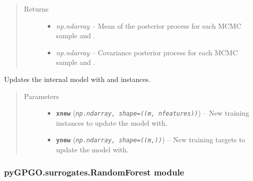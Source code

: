 \documentclass[letterpaper,10pt,english]{sphinxmanual}
\begin{document}
\begin{fulllineitems}
\begin{fulllineitems}
\begin{quote}
\begin{description}
\begin{itemize}
\end{itemize}

\item[{Returns}] \leavevmode
\begin{itemize}
\item {} 
\emph{np.ndarray} -- Mean of the posterior process for each MCMC sample and .

\item {} 
\emph{np.ndarray} -- Covariance posterior process for each MCMC sample and .

\end{itemize}


\end{description}\end{quote}

\end{fulllineitems}


\begin{fulllineitems}
\label{pyGPGO.surrogates.GaussianProcessMCMC:pyGPGO.surrogates.GaussianProcessMCMC.GaussianProcessMCMC.update}
Updates the internal model with  and  instances.
\begin{quote}\begin{description}
\item[{Parameters}] \leavevmode\begin{itemize}
\item {} 
\textbf{\texttt{xnew}} (\emph{\texttt{np.ndarray, shape=((m, nfeatures))}}) -- New training instances to update the model with.

\item {} 
\textbf{\texttt{ynew}} (\emph{\texttt{np.ndarray, shape=((m,))}}) -- New training targets to update the model with.

\end{itemize}

\end{description}\end{quote}

\end{fulllineitems}


\end{fulllineitems}



\subsubsection{pyGPGO.surrogates.RandomForest module}
\label{pyGPGO.surrogates.RandomForest:module-pyGPGO.surrogates.RandomForest}\label{pyGPGO.surrogates.RandomForest:pygpgo-surrogates-randomforest-module}\label{pyGPGO.surrogates.RandomForest::doc}
\end{document}

